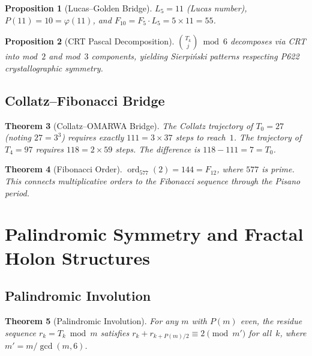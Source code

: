 \documentclass[11pt, a4paper]{article}
\theoremstyle{plain}
\newtheorem{theorem}{Theorem}[section]
\newtheorem{proposition}[theorem]{Proposition}
\theoremstyle{definition}
\theoremstyle{remark}
\newcommand{\ord}{\operatorname{ord}}
\begin{document}
\begin{proposition}[Lucas--Golden Bridge]\label{prop:lucas}
$L_5 = 11$ (Lucas number), $P(11) = 10 = \varphi(11)$, and
$F_{10} = F_5 \cdot L_5 = 5 \times 11 = 55$.
\end{proposition}

\begin{proposition}[CRT Pascal Decomposition]\label{prop:crt-pascal}
$\binom{T_k}{j} \bmod 6$ decomposes via CRT into mod~$2$ and mod~$3$
components, yielding Sierpi\'nski patterns respecting P622
crystallographic symmetry.
\end{proposition}

\subsection{Collatz--Fibonacci Bridge}\label{sec:collatz}

\begin{theorem}[Collatz--OMARWA Bridge]\label{thm:collatz}
The Collatz trajectory of $T_0 = 27$ (noting $27 = 3^3$) requires
exactly $111 = 3 \times 37$ steps to reach~$1$. The trajectory of
$T_4 = 97$ requires $118 = 2 \times 59$ steps. The difference is
$118 - 111 = 7 = T_0$.
\end{theorem}

\begin{theorem}[Fibonacci Order]\label{thm:fib-order}
$\ord_{577}(2) = 144 = F_{12}$, where $577$ is prime. This connects
multiplicative orders to the Fibonacci sequence through the Pisano
period.
\end{theorem}

\section{Palindromic Symmetry and Fractal Holon
  Structures}\label{sec:palindrome}

\subsection{Palindromic Involution}

\begin{theorem}[Palindromic Involution]\label{thm:palindrome}
For any $m$ with $P(m)$ even, the residue sequence
$r_k = T_k \bmod m$ satisfies
$r_k + r_{k + P(m)/2} \equiv 2 \pmod{m'}$ for all~$k$, where
$m' = m/\gcd(m,6)$.
\end{theorem}
\end{document}
